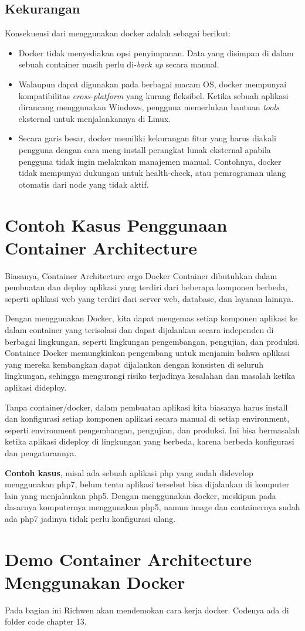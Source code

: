 \subsection{Kekurangan}
Konsekuensi dari menggunakan docker adalah sebagai berikut:
\begin{itemize}
\item Docker tidak menyediakan opsi penyimpanan. Data yang disimpan di dalam sebuah container masih perlu di-\textit{back up} secara manual.
\item Walaupun dapat digunakan pada berbagai macam OS, docker mempunyai kompatibilitas \textit{cross-platform} yang kurang fleksibel. Ketika sebuah aplikasi dirancang menggunakan Windows, pengguna memerlukan bantuan \textit{tools} eksternal untuk menjalankannya di Linux.
\item Secara garis besar, docker memiliki kekurangan fitur yang harus diakali pengguna dengan cara meng-install perangkat lunak eksternal apabila pengguna tidak ingin melakukan manajemen manual. Contohnya, docker tidak mempunyai dukungan untuk health-check, atau pemrograman ulang otomatis dari node yang tidak aktif.
\end{itemize}

\section{Contoh Kasus Penggunaan Container Architecture}

Biasanya, Container Architecture ergo Docker Container dibutuhkan dalam pembuatan dan deploy aplikasi yang terdiri dari beberapa komponen berbeda, seperti {aplikasi web} yang terdiri dari server web, database, dan layanan lainnya.

Dengan menggunakan Docker, kita dapat mengemas setiap komponen aplikasi ke dalam container yang terisolasi dan dapat dijalankan secara independen di berbagai lingkungan, seperti lingkungan pengembangan, pengujian, dan produksi. Container Docker memungkinkan pengembang untuk menjamin bahwa aplikasi yang mereka kembangkan dapat dijalankan dengan konsisten di seluruh lingkungan, sehingga mengurangi risiko terjadinya kesalahan dan masalah ketika aplikasi dideploy.

Tanpa container/docker, dalam pembuatan aplikasi kita biasanya harus install dan konfigurasi setiap komponen aplikasi secara manual di setiap environment, seperti environment pengembangan, pengujian, dan produksi. Ini bisa bermasalah ketika aplikasi dideploy di lingkungan yang berbeda, karena berbeda konfigurasi dan pengaturannya. 

\textbf{Contoh kasus}, misal ada sebuah aplikasi php yang sudah didevelop menggunakan php7, belum tentu aplikasi tersebut bisa dijalankan di komputer lain yang menjalankan php5. Dengan menggunakan docker, meskipun pada dasarnya komputernya menggunakan php5, namun image dan containernya sudah ada php7 jadinya tidak perlu konfigurasi ulang.

\section{Demo Container Architecture Menggunakan Docker}
Pada bagian ini Richwen akan mendemokan cara kerja docker. Codenya ada di folder code chapter 13.



